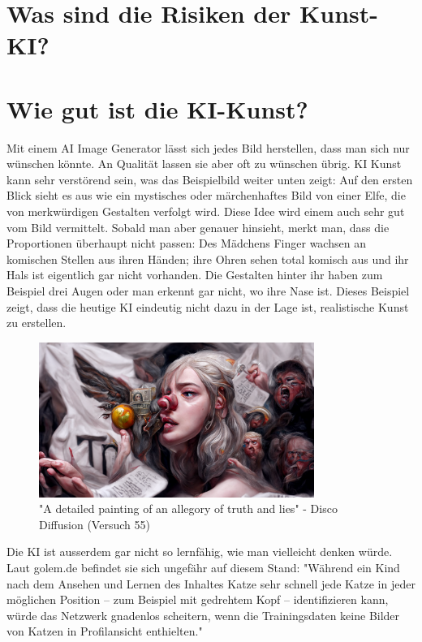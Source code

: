 \documentclass{article}
\begin{document}
\section{Was sind die Risiken der Kunst-KI?}


\section{Wie gut ist die KI-Kunst?}
    Mit einem AI Image Generator lässt sich jedes Bild herstellen, dass man sich nur wünschen könnte. 
    An Qualität lassen sie aber oft zu wünschen übrig. 
    KI Kunst kann sehr verstörend sein, was das Beispielbild weiter unten zeigt: Auf den ersten Blick sieht es aus wie ein mystisches oder 
    märchenhaftes Bild von einer Elfe, die von merkwürdigen Gestalten verfolgt wird. Diese Idee wird einem 
    auch sehr gut vom Bild vermittelt. Sobald man aber genauer hinsieht, merkt man, dass die Proportionen
    überhaupt nicht passen: Des Mädchens Finger wachsen an komischen Stellen aus ihren Händen; ihre Ohren 
    sehen total komisch aus und ihr Hals ist eigentlich gar nicht vorhanden. Die Gestalten hinter ihr haben 
    zum Beispiel drei Augen oder man erkennt gar nicht, wo ihre Nase ist. Dieses Beispiel zeigt, dass die 
    heutige KI eindeutig nicht dazu in der Lage ist, realistische Kunst zu erstellen.
    \begin{figure}[h]
    \centering
    \includegraphics[width=0.8\textwidth]{ki-bild.png} 
    \caption{"A detailed painting of an allegory of truth and lies" - Disco Diffusion (Versuch 55)}
    \label{fig:ki-bild}
    \end{figure}
    Die KI ist ausserdem gar nicht so lernfähig, wie man vielleicht denken würde. Laut golem.de befindet sie sich 
    ungefähr auf diesem Stand: "Während ein Kind nach dem Ansehen und Lernen des Inhaltes Katze sehr schnell 
    jede Katze in jeder möglichen Position – zum Beispiel mit gedrehtem Kopf – identifizieren kann, würde 
    das Netzwerk gnadenlos scheitern, wenn die Trainingsdaten keine Bilder von Katzen in Profilansicht enthielten." 
\end{document}
